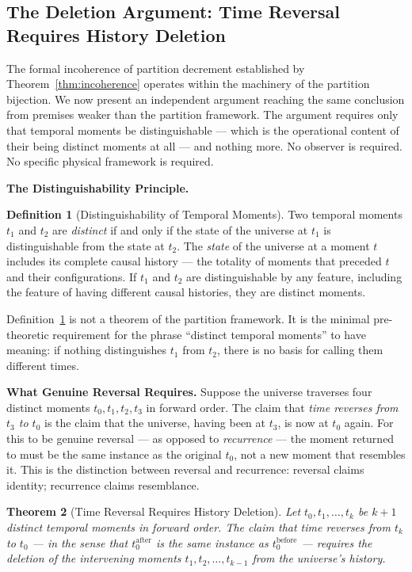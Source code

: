 \documentclass[twocolumn,10pt,a4paper]{article}
\theoremstyle{thmstyle}
\newtheorem{theorem}{Theorem}[section]
\theoremstyle{definition}
\newtheorem{definition}[theorem]{Definition}
\theoremstyle{remark}
\begin{document}
\subsection{The Deletion Argument: Time Reversal Requires History Deletion}
\label{sec:deletion-argument}

The formal incoherence of partition decrement established by Theorem~\ref{thm:incoherence} operates within the machinery of the partition bijection. We now present an independent argument reaching the same conclusion from premises weaker than the partition framework. The argument requires only that temporal moments be distinguishable --- which is the operational content of their being distinct moments at all --- and nothing more. No observer is required. No specific physical framework is required.

\textbf{The Distinguishability Principle.}

\begin{definition}[Distinguishability of Temporal Moments]
\label{def:distinguishability}
Two temporal moments $t_1$ and $t_2$ are \emph{distinct} if and only if the state of the universe at $t_1$ is distinguishable from the state at $t_2$. The \emph{state} of the universe at a moment $t$ includes its complete causal history --- the totality of moments that preceded $t$ and their configurations. If $t_1$ and $t_2$ are distinguishable by any feature, including the feature of having different causal histories, they are distinct moments.
\end{definition}

Definition~\ref{def:distinguishability} is not a theorem of the partition framework. It is the minimal pre-theoretic requirement for the phrase ``distinct temporal moments'' to have meaning: if nothing distinguishes $t_1$ from $t_2$, there is no basis for calling them different times.

\textbf{What Genuine Reversal Requires.} Suppose the universe traverses four distinct moments $t_0, t_1, t_2, t_3$ in forward order. The claim that \emph{time reverses from $t_3$ to $t_0$} is the claim that the universe, having been at $t_3$, is now at $t_0$ again. For this to be genuine reversal --- as opposed to \emph{recurrence} --- the moment returned to must be the same instance as the original $t_0$, not a new moment that resembles it. This is the distinction between reversal and recurrence: reversal claims identity; recurrence claims resemblance.

\begin{theorem}[Time Reversal Requires History Deletion]
\label{thm:deletion}
Let $t_0, t_1, \ldots, t_k$ be $k+1$ distinct temporal moments in forward order. The claim that time reverses from $t_k$ to $t_0$ --- in the sense that $t_0^{\mathrm{after}}$ is the same instance as $t_0^{\mathrm{before}}$ --- requires the deletion of the intervening moments $t_1, t_2, \ldots, t_{k-1}$ from the universe's history.
\end{theorem}
\end{document}
